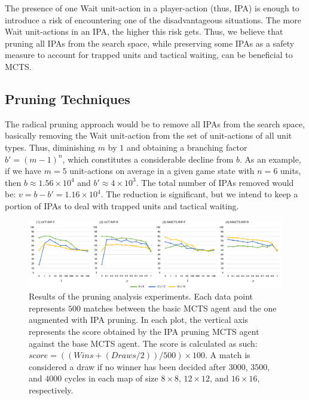 \documentclass[conference]{IEEEtran}
\begin{document}
The presence of one Wait unit-action in a player-action (thus, IPA) is enough to introduce a risk of encountering one of the disadvantageous situations. The more Wait unit-actions in an IPA, the higher this risk gets. Thus, we believe that pruning all IPAs from the search space, while preserving some IPAs as a safety measure to account for trapped units and tactical waiting, can be beneficial to MCTS.



\subsection{Pruning Techniques}

The radical pruning approach would be to remove all IPAs from the search space, basically removing the Wait unit-action from the set of unit-actions of all unit types. Thus, diminishing $m$ by $1$ and obtaining a branching factor $b' = (m - 1)^n$, which constitutes a considerable decline from $b$. As an example, if we have $m=5$ unit-actions on average in a given game state with $n=6$ units, then $b \approx 1.56\times10^4$ and $b' \approx 4\times10^3$. The total number of IPAs removed would be: $v = b - b' = 1.16\times10^4$. The reduction is significant, but we intend to keep a portion of IPAs to deal with trapped units and tactical waiting.

\begin{figure}[!h]
\begin{center}
	\includegraphics[width=1\textwidth]{figs/PT-h.pdf}
	\caption{Results of the pruning analysis experiments. Each data point represents $500$ matches between the basic MCTS agent and the one augmented with IPA pruning. In each plot, the vertical axis represents the score obtained by the IPA pruning MCTS agent against the base MCTS agent. The score is calculated as such: $score = ((Wins + (Draws / 2)) / 500) \times 100$. A match is considered a draw if no winner has been decided after $3000$, $3500$, and $4000$ cycles in each map of size $8\times8$, $12\times12$, and $16\times16$, respectively.}
	\label{PruningAnalysis}
\end{center}
\end{figure}
\end{document}

